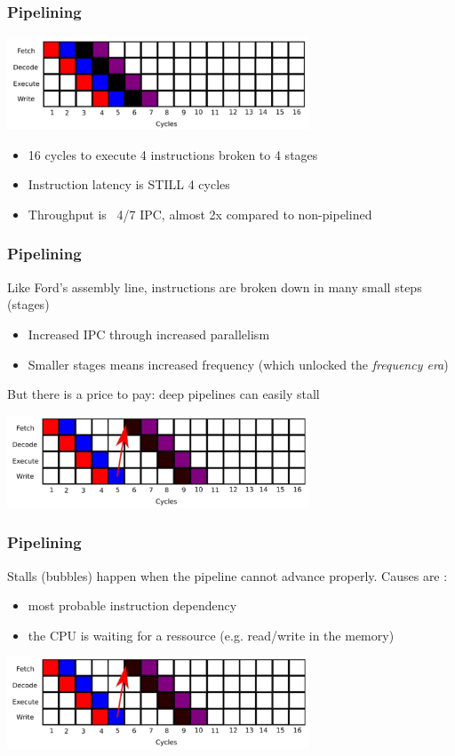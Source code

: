 \begin{frame}[containsverbatim]
\frametitle{Pipelining}
\begin{center}
\includegraphics[width=9cm]{DayGilles/images/pipeline-with.jpg}
\end{center}
\begin{itemize}
\item 16 cycles to execute 4 instructions broken to 4 stages
\item Instruction latency is STILL 4 cycles 
\item Throughput is ~4/7 IPC, almost 2x compared to non-pipelined
\end{itemize}
\end{frame}


\begin{frame}[containsverbatim]
\frametitle{Pipelining}
Like Ford's assembly line, instructions are broken down in many small steps (stages)
\begin{itemize}
\item Increased IPC through increased parallelism
\item Smaller stages means increased frequency (which unlocked the \textit{frequency era})
\end{itemize}
But there is a price to pay: deep pipelines can easily stall
\begin{center}
\includegraphics[width=9cm]{DayGilles/images/pipeline-stall.jpg}
\end{center}
\end{frame}


\begin{frame}[containsverbatim]
\frametitle{Pipelining}
Stalls (bubbles) happen when the pipeline cannot advance properly. Causes are :
\begin{itemize}
\item most probable instruction dependency
\item the CPU is waiting for a ressource (e.g. read/write in the memory)
\end{itemize}
\begin{center}
\includegraphics[width=9cm]{DayGilles/images/pipeline-stall.jpg}
\end{center}
\end{frame}



